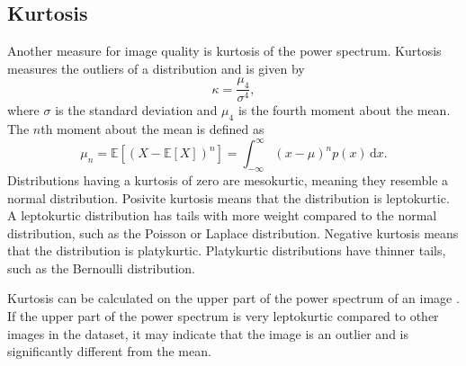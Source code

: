 \subsection{Kurtosis}
Another measure for image quality is kurtosis of the power spectrum.
Kurtosis measures the outliers of a distribution and is given by
\begin{equation}
    \kappa = \frac{\mu_4}{\sigma^4},
\end{equation}
where $\sigma$ is the standard deviation and $\mu_4$ is the fourth moment about the mean.
The $n$th moment about the mean is defined as
\begin{equation}
    \mu_n = \mathbb{E}[(X-\mathbb{E}[X])^n] = \int_{-\infty}^\infty (x-\mu)^n p(x)\,\mathrm{d}x.
\end{equation}
Distributions having a kurtosis of zero are mesokurtic, meaning they resemble a normal distribution.
Posivite kurtosis means that the distribution is leptokurtic.
A leptokurtic distribution has tails with more weight compared to the normal distribution, such as the Poisson or Laplace distribution.
Negative kurtosis means that the distribution is platykurtic.
Platykurtic distributions have thinner tails, such as the Bernoulli distribution.

Kurtosis can be calculated on the upper part of the power spectrum of an image \cite{Koho2016,Blokker2022}.
If the upper part of the power spectrum is very leptokurtic compared to other images in the dataset, it may indicate that the image is an outlier and is significantly different from the mean.
